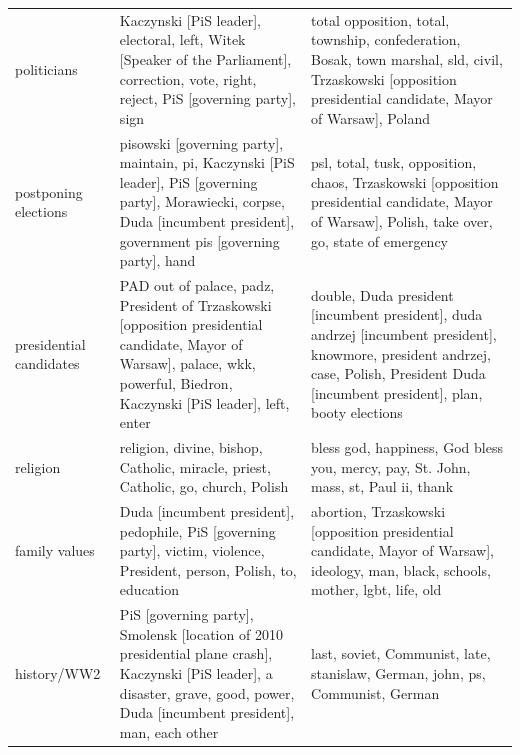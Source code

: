 \documentclass{article}
\begin{document}
\begin{longtable}{p{2cm}p{6cm}p{6cm}}
		politicians &                                          Kaczynski [PiS leader], electoral, left, Witek [Speaker of the Parliament], correction, vote, right, reject, PiS [governing party], sign &                                      total opposition, total, township, confederation, Bosak, town marshal, sld, civil, Trzaskowski [opposition presidential candidate, Mayor of Warsaw], Poland \\
		postponing elections &   pisowski [governing party], maintain, pi, Kaczynski [PiS leader], PiS [governing party], Morawiecki, corpse, Duda [incumbent president], government pis [governing party], hand &                                                 psl, total, tusk, opposition, chaos, Trzaskowski [opposition presidential candidate, Mayor of Warsaw], Polish, take over, go, state of emergency \\
		presidential candidates &       PAD out of palace, padz, President of Trzaskowski [opposition presidential candidate, Mayor of Warsaw], palace, wkk, powerful, Biedron, Kaczynski [PiS leader], left, enter &         double, Duda president [incumbent president], duda andrzej [incumbent president], knowmore, president andrzej, case, Polish, President Duda [incumbent president], plan, booty elections \\
		religion &                                                                                                 religion, divine, bishop, Catholic, miracle, priest, Catholic, go, church, Polish &                                                                                                              bless god, happiness, God bless you, mercy, pay, St. John, mass, st, Paul ii, thank \\
		family values &                                                          Duda [incumbent president], pedophile, PiS [governing party], victim, violence, President, person, Polish, to, education &                                                               abortion, Trzaskowski [opposition presidential candidate, Mayor of Warsaw], ideology, man, black, schools, mother, lgbt, life, old \\
		history/WW2 &  PiS [governing party], Smolensk [location of 2010 presidential plane crash], Kaczynski [PiS leader], a disaster, grave, good, power, Duda [incumbent president], man, each other &                                                                                                                    last, soviet, Communist, late, stanislaw, German, john, ps, Communist, German \\

\end{longtable}
\end{document}
